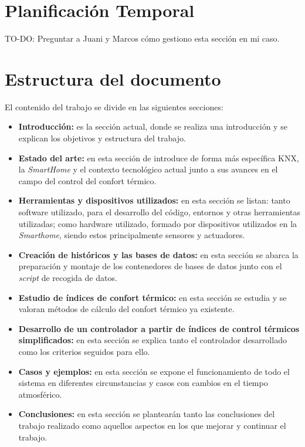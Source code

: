 \section{Planificación Temporal}

TO-DO: Preguntar a Juani y Marcos cómo gestiono esta sección en mi caso.

\section{Estructura del documento}

El contenido del trabajo se divide en las siguientes secciones:

\begin{itemize}
    \item \textbf{Introducción:} es la sección actual, donde se realiza una introducción y se explican los objetivos y estructura del trabajo.
    \item \textbf{Estado del arte:} en esta sección de introduce de forma más específica KNX, la \textit{SmartHome} y el contexto tecnológico actual junto a sus avances en el campo del control del confort térmico.
    \item \textbf{Herramientas y dispositivos utilizados:} en esta sección se listan: tanto software utilizado, para el desarrollo del código, entornos y otras herramientas utilizadas; como hardware utilizado, formado por dispositivos utilizados en la \textit{Smarthome}, siendo estos principalmente sensores y actuadores.
    \item \textbf{Creación de históricos y las bases de datos:} en esta sección se abarca la preparación y montaje de los contenedores de bases de datos junto con el \textit{script} de recogida de datos.
    \item \textbf{Estudio de índices de confort térmico:} en esta sección se estudia y se valoran métodos de cálculo del confort térmico ya existente.
    \item \textbf{Desarrollo de un controlador a partir de índices de control térmicos simplificados:} en esta sección se explica tanto el controlador desarrollado como los criterios seguidos para ello.
    \item \textbf{Casos y ejemplos:} en esta sección se expone el funcionamiento de todo el sistema en diferentes circunstancias y casos con cambios en el tiempo atmosférico.
    \item \textbf{Conclusiones:} en esta sección se plantearán tanto las conclusiones del trabajo realizado como aquellos aspectos en los que mejorar y continuar el trabajo.
\end{itemize}

